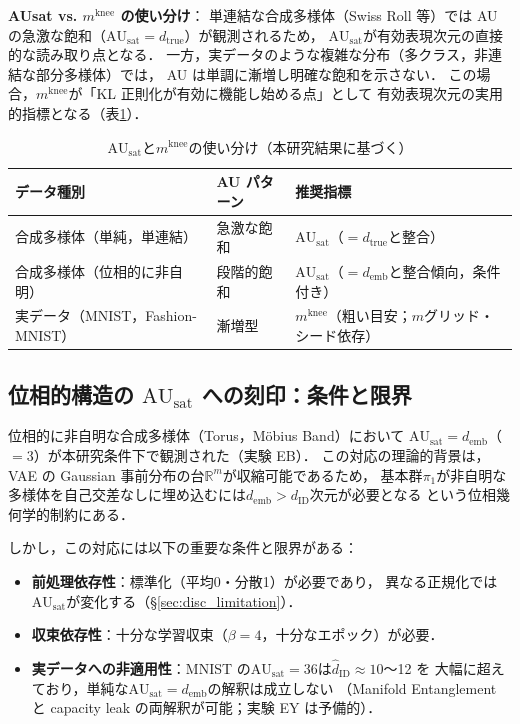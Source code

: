 \documentclass[11pt,a4paper]{jsarticle}
\newcommand{\dID}{d_{\mathrm{ID}}}
\newcommand{\dtrue}{d_{\mathrm{true}}}
\newcommand{\R}{\mathbb{R}}
\newcommand{\AUsat}{\mathrm{AU}_{\mathrm{sat}}}
\newcommand{\mknee}{m^{\mathrm{knee}}}
\newcommand{\demb}{d_{\mathrm{emb}}}
\begin{document}
\textbf{AUsat vs. $\mknee$ の使い分け}：
単連結な合成多様体（Swiss Roll 等）では AU の急激な飽和（$\AUsat = \dtrue$）が観測されるため，
$\AUsat$が有効表現次元の直接的な読み取り点となる．
一方，実データのような複雑な分布（多クラス，非連結な部分多様体）では，
AU は単調に漸増し明確な飽和を示さない．
この場合，$\mknee$が「KL 正則化が有効に機能し始める点」として
有効表現次元の実用的指標となる（表\ref{tab:au_comparison}）．

\begin{table}[H]
\centering
\caption{$\AUsat$と$\mknee$の使い分け（本研究結果に基づく）}
\label{tab:au_comparison}
\small
\begin{tabular}{lll}
\toprule
データ種別 & AU パターン & 推奨指標 \\
\midrule
合成多様体（単純，単連結） & 急激な飽和 & $\AUsat$（$= \dtrue$と整合） \\
合成多様体（位相的に非自明） & 段階的飽和 & $\AUsat$（$= \demb$と整合傾向，条件付き） \\
実データ（MNIST，Fashion-MNIST） & 漸増型 & $\mknee$（粗い目安；$m$グリッド・シード依存） \\
\bottomrule
\end{tabular}
\end{table}

\subsection{位相的構造の $\AUsat$ への刻印：条件と限界}\label{sec:disc_topology}

位相的に非自明な合成多様体（Torus，Möbius Band）において
$\AUsat = \demb$（$= 3$）が本研究条件下で観測された（実験 EB）．
この対応の理論的背景は，VAE の Gaussian 事前分布の台$\R^m$が収縮可能であるため，
基本群$\pi_1$が非自明な多様体を自己交差なしに埋め込むには$\demb > \dID$次元が必要となる
という位相幾何学的制約\cite{hatcher2002algebraic,guillemin1974differential}にある．

しかし，この対応には以下の重要な条件と限界がある：
\begin{itemize}
  \item \textbf{前処理依存性}：標準化（平均0・分散1）が必要であり，
        異なる正規化では$\AUsat$が変化する（§\ref{sec:disc_limitation}）．
  \item \textbf{収束依存性}：十分な学習収束（$\beta = 4$，十分なエポック）が必要．
  \item \textbf{実データへの非適用性}：MNIST の$\AUsat = 36$は$\hat{d}_\mathrm{ID} \approx 10$〜12 を
        大幅に超えており，単純な$\AUsat = \demb$の解釈は成立しない
        （Manifold Entanglement と capacity leak の両解釈が可能；実験 EY は予備的）．
\end{itemize}
\end{document}
